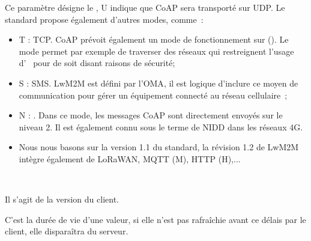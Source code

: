 {
Ce paramètre désigne le , U indique que CoAP sera transporté sur UDP. Le standard propose également d'autres modes, comme~:
\begin{itemize}
    \item T : TCP. CoAP prévoit également un mode de fonctionnement sur  (). Le mode permet par exemple de traverser des réseaux qui restreignent l'usage d'~ pour de soit disant raisons de sécurité;
    \item S : SMS. LwM2M est défini par l'\acl{OMA}, il est logique d'inclure ce moyen de communication pour gérer un équipement connecté au réseau cellulaire~;
    \item N : . Dans ce mode, les messages CoAP sont directement envoyés sur le niveau 2. Il est également connu sous le terme de \ac{NIDD} dans les réseaux 4G.
    \item Nous nous basons sur la version 1.1 du standard, la révision 1.2 de LwM2M intègre également de LoRaWAN, MQTT (M), HTTP (H),...
\end{itemize}

~

}


{Il s'agit de la version du client. }

{C'est la durée de vie d'une valeur, si elle n'est pas rafraîchie avant ce délais par le client, elle disparaîtra du serveur. }

